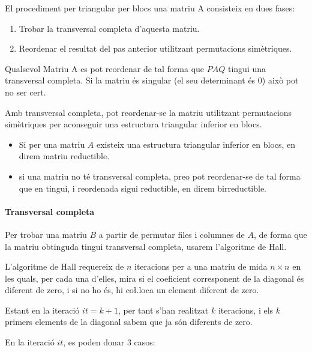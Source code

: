 \documentclass[11pt,a4paper,twoside]{report}
\begin{document}
El procediment per triangular per blocs una matriu A consisteix en dues fases:
\begin{enumerate}
\item Trobar la transversal completa d'aquesta matriu.
\item Reordenar el resultat del pas anterior utilitzant permutacions simètriques.
\end{enumerate}

Qualsevol Matriu A es pot reordenar de tal forma que $PAQ$ tingui una transversal completa. Si la matriu és singular (el seu determinant és 0) això pot no ser cert.

Amb transversal completa, pot reordenar-se la matriu utilitzant permutacions simètriques per aconseguir una estructura triangular inferior en blocs.

\begin{itemize}
\item Si per una matriu $A$ existeix una estructura triangular inferior en blocs, en direm matriu reductible.\\
\item si una matriu no té transversal completa, preo pot reordenar-se de tal forma que en tingui, i reordenada sigui reductible, en direm birreductible.
\end{itemize}

\paragraph{Transversal completa} \mbox{}

Per trobar una matriu $B$ a partir de permutar files i columnes de $A$, de forma que la matriu obtinguda tingui transversal completa, usarem l'algoritme de Hall.

L'algoritme de Hall requereix de $n$ iteracions per a una matriu de mida $n \times n$ en les quals, per cada una d'elles, mira si el coeficient corresponent de la diagonal és diferent de zero, i si no ho és, hi co\l.loca un element diferent de zero.

Estant en la iteració $it = k+1$, per tant s'han realitzat $k$ iteracions, i els $k$ primers elements de la diagonal sabem que ja són diferents de zero. 

En la iteració $it$, es poden donar 3 casos:
\end{document}
